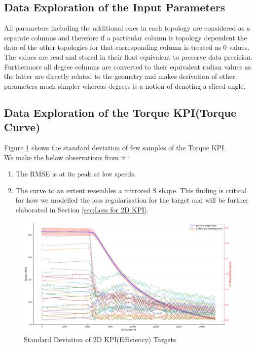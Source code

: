 \documentclass{report} %
\begin{document}
\subsection{Data Exploration of the Input Parameters}\label{sec:Deep Dive into Input Parameters}
All parameters including the additional ones in each topology are considered as a separate columns and therefore if a particular column is topology dependent the data of the other topologies for that corresponding column is treated as 0 values.\\
The values are read and stored in their float equivalent to preserve data precision. \\
Furthermore all degree columns are converted to their equivalent radian values as the latter are directly related to the geometry and makes derivation of other parameters much simpler whereas degrees is a notion of denoting a sliced angle.\\

\subsection{Data Exploration of the Torque \ac{KPI}(Torque Curve)}\label{sec:Deep Dive into 2D KPI}

Figure \ref{fig:Standard Deviation of 2D KPI(Efficiency) Targets} shows the standard deviation of few samples of the Torque \ac{KPI}.\\

We make the below  observations from it :
\begin{enumerate}
    \item The \ac{RMSE} is at its peak at low speeds.
    \item The curve to an extent resembles a mirrored S shape.
    This finding is critical for how we modelled the loss regularization for the target and will be further elaborated in Section \ref{sec:Loss for 2D KPI}.
\end{enumerate}

\begin{figure}[H]
    \centering
    \includegraphics[width=1\textwidth]{./ReportImages/StandardDeviation_Baseline_y1.png} 
    \caption{Standard Deviation of 2D KPI(Efficiency) Targets} 
    \label{fig:Standard Deviation of 2D KPI(Efficiency) Targets}
\end{figure}
\end{document}
